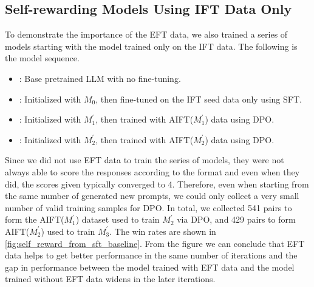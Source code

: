 \documentclass{article}
\begin{document}
\subsection{Self-rewarding Models Using IFT Data Only}
\label{app:self_reward_ift_only}
To demonstrate the importance of the EFT data, we also trained a series of models starting with the model trained only on the IFT data. The following is the model sequence.

\begin{itemize}
\item[$M_0$]: Base pretrained LLM with no fine-tuning.
\item[$M_1^\prime$]: Initialized with $M_0$, then fine-tuned on the IFT seed data only using SFT.
\item[$M_2^\prime$]: Initialized with $M_1^\prime$, then trained with AIFT($M_1^\prime$) data using DPO.
\item[$M_3^\prime$]: Initialized with $M_2^\prime$, then trained with AIFT($M_2^\prime$) data using DPO.
\end{itemize}

Since we did not use EFT data to train the series of models, they were not always able to score the responses according to the format and even when they did, the scores given typically converged to 4. Therefore, even when starting from the same number of generated new prompts, we could only collect a very small number of valid training samples for DPO.
In total, we collected 541 pairs to form the AIFT($M_1^\prime$) dataset used to train $M_2^\prime$ via DPO, and 429 pairs to form AIFT($M_2^\prime$) used to train $M_3^\prime$. The win rates are shown in \autoref{fig:self_reward_from_sft_baseline}. From the figure we can conclude that EFT data helps to get better performance in the same number of iterations and the gap in performance between the model trained with EFT data and the model trained without EFT data widens in the later iterations.
\end{document}
